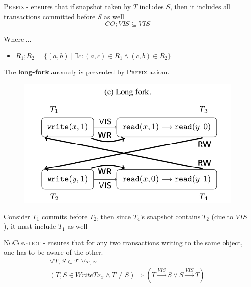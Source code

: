 \documentclass{beamer}
\begin{document}
\begin{frame}
	\begin{definition}[Prefix]
		\textsc{Prefix} - ensures that if snapshot taken by $T$ includes $S$, then it includes all transactions committed before $S$ as well.
		$$ CO; VIS \subseteq VIS $$
	\end{definition}
	Where ...
	\begin{itemize}
		\item $R_1;R_2 = \{(a,b) \mid \exists c: (a,c) \in R_1 \wedge (c,b) \in R_2\} $
	\end{itemize}
\end{frame}

\begin{frame}
	The \textbf{long-fork} anomaly is prevented by \textsc{Prefix} axiom:
	\begin{figure}
		\includegraphics[scale=0.3]{fig2c}
	\end{figure}
	\begin{example}
		Consider $T_1$ commits before $T_2$, then since $T_4$'s snapshot contains $T_2$ (due to $VIS$), it must include $T_1$ as well
	\end{example}
\end{frame}

\begin{frame}
	\begin{definition}
		\textsc{NoConflict} - ensures that for any two transactions writing to the same object, one has to be aware of the other.
		\begin{multline*}
		\forall T,S \in \mathcal{T}. \forall x,n . \\
		\left( T,S \in WriteTx_x \wedge T \ne S \right)
		\Rightarrow
		\left( T \xrightarrow{VIS} S \vee S \xrightarrow{VIS} T \right)
		\end{multline*}
	\end{definition}
\end{frame}
\end{document}
